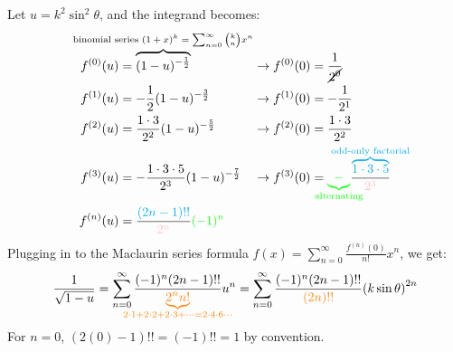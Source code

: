 \documentclass[preview]{standalone}
\begin{document}
\color{white}

Let $u = k^2 \sin^2 \theta$, and the integrand becomes:
\begin{align*}
    f^{(0)}(u) &= \overbrace{(1-u)^{-\frac{1}{2}}}^{\mathclap{\text{binomial series $(1+x)^k =
\sum_{n=0}^{\infty} \binom{k}{n} x^n$}}} &&\rightarrow f^{(0)}(0) =
    \frac{1}{\cancel{2^0}} \\
    f^{(1)}(u) &= -\frac{1}{2} (1-u)^{-\frac{3}{2}} &&\rightarrow
    f^{(1)}(0) = -\frac{1}{2^1} \\
    f^{(2)}(u) &= \frac{1\cdot3}{2^2} (1-u)^{-\frac{5}{2}}
    &&\rightarrow f^{(2)}(0) = \frac{1\cdot3}{2^2} \\
    f^{(3)}(u) &= -\frac{1\cdot3\cdot5}{2^3} (1-u)^{-\frac{7}{2}}
    &&\rightarrow f^{(3)}(0) =
    {\color{green}\underbrace{-}_{\mathclap{\text{alternating}}}}
    \frac{\color{cyan}\overbrace{1\cdot3\cdot5}^{\mathclap{\text{odd-only
    factorial}}}}{\color{pink}2^3} \\
    f^{(n)}(u) &= \frac{{\color{cyan}(2n-1)!!}}{{\color{pink}2^n}}
    {\color{green}(-1)^n}
  \end{align*}
Plugging in to the Maclaurin series formula $f(x) =
\sum_{n=0}^{\infty} \frac{f^{(n)}(0)}{n!} x^n$, we get:
\[
  \frac{1}{\sqrt{1 - u}} = \sum_{n=0}^{\infty} \frac{(-1)^n
  (2n-1)!!}{\color{orange}\underbrace{2^n n!}_{\mathclap{2 \cdot 1 + 2 \cdot 2 + 2 \cdot 3 + \cdots = 2 \cdot 4 \cdot 6 \cdots}}} u^n = \sum_{n=0}^{\infty} \frac{(-1)^n (2n-1)!!}{\color{orange} (2n)!!}
  {\left(k\sin\theta\right)}^{2n}
\]
For $n = 0$, $(2(0) - 1)!! = (-1)!! = 1$ by
convention.
\end{document}
